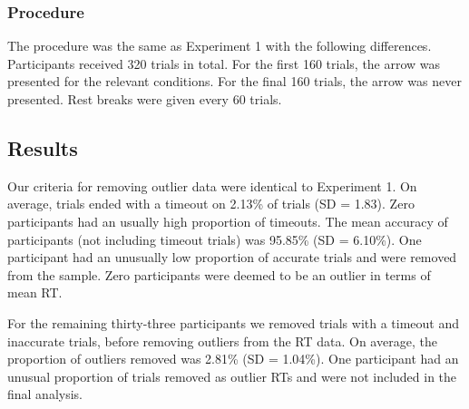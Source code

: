 \documentclass[
  man,floatsintext]{apa7}
\begin{document}
\hypertarget{procedure-1}{%
\subsubsection{Procedure}\label{procedure-1}}

The procedure was the same as Experiment 1 with the following differences. Participants received 320 trials in total. For the first 160 trials, the arrow was presented for the relevant conditions. For the final 160 trials, the arrow was never presented. Rest breaks were given every 60 trials.

\hypertarget{results-1}{%
\subsection{Results}\label{results-1}}

Our criteria for removing outlier data were identical to Experiment 1. On average, trials ended with a timeout on 2.13\% of trials (SD = 1.83). Zero participants had an usually high proportion of timeouts. The mean accuracy of participants (not including timeout trials) was 95.85\% (SD = 6.10\%). One participant had an unusually low proportion of accurate trials and were removed from the sample. Zero participants were deemed to be an outlier in terms of mean RT.

For the remaining thirty-three participants we removed trials with a timeout and inaccurate trials, before removing outliers from the RT data. On average, the proportion of outliers removed was 2.81\% (SD = 1.04\%). One participant had an unusual proportion of trials removed as outlier RTs and were not included in the final analysis.
\end{document}

